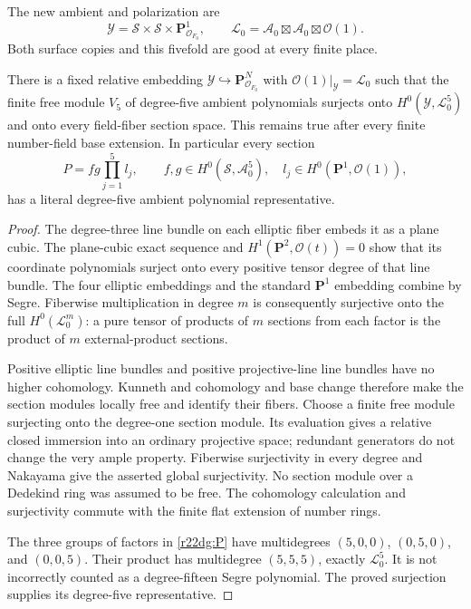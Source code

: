 The new ambient and polarization are
\[
 \mathcal Y=\mathcal S\times\mathcal S\times\mathbf P^1_{\mathcal O_{F_0}},
 \qquad \mathcal L_0=\mathcal A_0\boxtimes\mathcal A_0\boxtimes\mathcal O(1).
 \tag{DG22.2}\label{r22dg:ambient}
\]
Both surface copies and this fivefold are good at every finite place.

\begin{lemma}
\label{r22dg:coefficients}
There is a fixed relative embedding
$\mathcal Y\hookrightarrow\mathbf P^N_{\mathcal O_{F_0}}$ with
$\mathcal O(1)|_{\mathcal Y}=\mathcal L_0$ such that the finite free
module $V_5$ of degree-five ambient polynomials surjects onto
$H^0(\mathcal Y,\mathcal L_0^5)$ and onto every field-fiber section
space.  This remains true after every finite number-field base
extension.  In particular every section
\[
 P=f g\prod_{j=1}^5l_j,\qquad
 f,g\in H^0(\mathcal S,\mathcal A_0^5),\quad
 l_j\in H^0(\mathbf P^1,\mathcal O(1)),
 \tag{DG22.3}\label{r22dg:P}
\]
has a literal degree-five ambient polynomial representative.
\end{lemma}

\begin{proof}
The degree-three line bundle on each elliptic fiber embeds it as
a plane cubic.  The plane-cubic exact sequence and
$H^1(\mathbf P^2,\mathcal O(t))=0$ show that its coordinate
polynomials surject onto every positive tensor degree of that
line bundle.  The four elliptic embeddings and the standard
$\mathbf P^1$ embedding combine by Segre.  Fiberwise multiplication
in degree $m$ is consequently surjective onto the full
$H^0(\mathcal L_0^m)$: a pure tensor of products of $m$ sections
from each factor is the product of $m$ external-product sections.

Positive elliptic line bundles and positive projective-line line
bundles have no higher cohomology.  Kunneth and cohomology and base
change therefore make the section modules locally free and identify
their fibers.  Choose a finite free module surjecting onto the
degree-one section module.  Its evaluation gives a relative closed
immersion into an ordinary projective space; redundant generators
do not change the very ample property.  Fiberwise surjectivity in
every degree and Nakayama give the asserted global surjectivity.
No section module over a Dedekind ring was assumed to be free.
The cohomology calculation and surjectivity commute with the finite
flat extension of number rings.

The three groups of factors in \eqref{r22dg:P} have multidegrees
$(5,0,0)$, $(0,5,0)$, and $(0,0,5)$.  Their product has
multidegree $(5,5,5)$, exactly $\mathcal L_0^5$.  It is not
incorrectly counted as a degree-fifteen Segre polynomial.
The proved surjection supplies its degree-five representative.
\end{proof}

